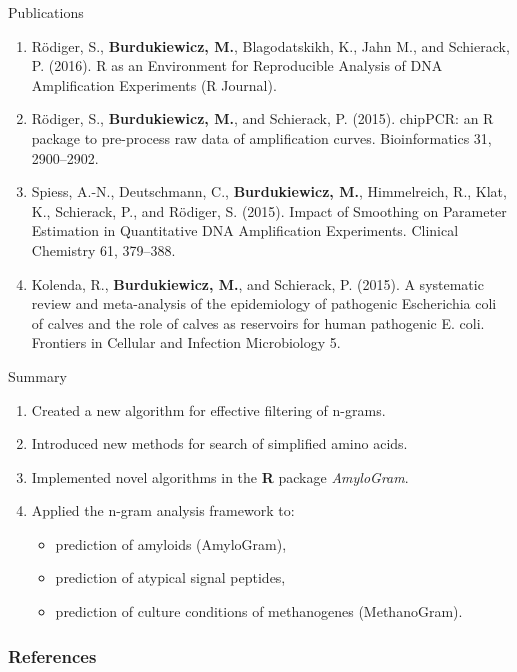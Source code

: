 \documentclass{beamer}\usepackage[]{graphicx}\usepackage[]{color}
\begin{document}
\begin{frame}[allowframebreaks]{Publications}
\begin{enumerate}
\item Rödiger, S., \textbf{Burdukiewicz, M.}, Blagodatskikh, K., Jahn M., and Schierack, P. (2016). R as an Environment for Reproducible Analysis of DNA Amplification Experiments (R Journal).

\item Rödiger, S., \textbf{Burdukiewicz, M.}, and Schierack, P. (2015). chipPCR: an R package to pre-process raw data of amplification curves. Bioinformatics 31, 2900–2902.

\item Spiess, A.-N., Deutschmann, C., \textbf{Burdukiewicz, M.}, Himmelreich, R., Klat, K., Schierack, P., and Rödiger, S. (2015). Impact of Smoothing on Parameter Estimation in Quantitative DNA Amplification Experiments. Clinical Chemistry 61, 379–388.

\item Kolenda, R., \textbf{Burdukiewicz, M.}, and Schierack, P. (2015). A systematic review and meta-analysis of the epidemiology of pathogenic Escherichia coli of calves and the role of calves as reservoirs for human pathogenic E. coli. Frontiers in Cellular and Infection Microbiology 5.
\end{enumerate}

\end{frame}

\begin{frame}{Summary}
\begin{enumerate}
\item Created a new algorithm for effective filtering of n-grams.

\item Introduced new methods for search of simplified amino acids.

\item Implemented novel algorithms in the \textbf{R} package \textit{AmyloGram}.

\item Applied the n-gram analysis framework to:
\begin{itemize}
\item prediction of amyloids (AmyloGram),
\item prediction of atypical signal peptides,
\item prediction of culture conditions of methanogenes (MethanoGram).
\end{itemize}
\end{enumerate}
\end{frame}  


\begin{frame}[allowframebreaks]
        \frametitle{References}
  
  
\end{frame}  
\end{document}
